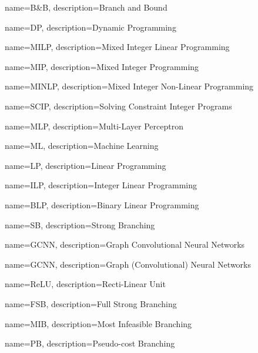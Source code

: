 

\makeglossaries %


{
        name=B\&B,
        description={Branch and Bound}
}

{
        name=DP,
        description={Dynamic Programming}
}

{
        name=MILP,
        description={Mixed Integer Linear Programming}
}

{
        name=MIP,
        description={Mixed Integer Programming}
}

{
        name=MINLP,
        description={Mixed Integer Non-Linear Programming}
}
 
{
        name=SCIP,
        description={Solving Constraint Integer Programs}
}

{
        name=MLP,
        description={Multi-Layer Perceptron}
}

{
        name=ML,
        description={Machine Learning}
}

{
        name=LP,
        description={Linear Programming}
}

{
        name=ILP,
        description={Integer Linear Programming}
}

{
        name=BLP,
        description={Binary Linear Programming}
}

{
        name=SB,
        description={Strong Branching}
}

{
        name=GCNN,
        description={Graph Convolutional Neural Networks}
}

{
        name=GCNN,
        description={Graph (Convolutional) Neural Networks}
}

{
        name=ReLU,
        description={Recti-Linear Unit}
}

{
        name=FSB,
        description={Full Strong Branching}
}

{
        name=MIB,
        description={Most Infeasible Branching}
}

{
        name=PB,
        description={Pseudo-cost Branching}
}

